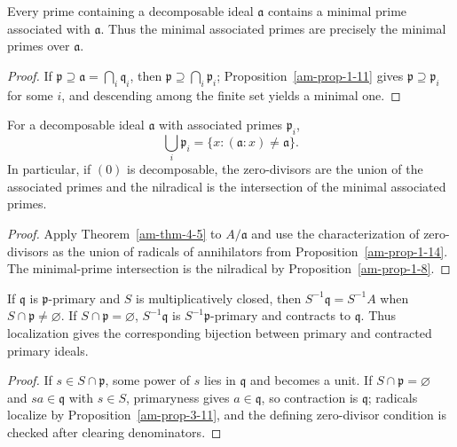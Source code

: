 \begin{proposition}
\label{am-prop-4-6}
\uses{}
Every prime containing a decomposable ideal $\mathfrak{a}$ contains a minimal prime
associated with $\mathfrak{a}$.  Thus the minimal associated primes are precisely
the minimal primes over $\mathfrak{a}$.
\end{proposition}
\begin{proof}
If $\mathfrak{p}\supseteq\mathfrak{a}=\bigcap_i\mathfrak{q}_i$, then
$\mathfrak{p}\supseteq\bigcap_i\mathfrak{p}_i$; Proposition~\ref{am-prop-1-11} gives
$\mathfrak{p}\supseteq\mathfrak{p}_i$ for some $i$, and descending among the finite set yields a
minimal one.
\end{proof}
\begin{proposition}
\label{am-prop-4-7}
\uses{}
For a decomposable ideal $\mathfrak{a}$ with associated primes $\mathfrak{p}_i$,
\[
\bigcup_i\mathfrak{p}_i=\{x:(\mathfrak{a}:x)\ne\mathfrak{a}\}.
\]
In particular, if $(0)$ is decomposable, the zero-divisors are the union of
the associated primes and the nilradical is the intersection of the minimal
associated primes.
\end{proposition}
\begin{proof}
Apply Theorem~\ref{am-thm-4-5} to $A/\mathfrak{a}$ and use the characterization of
zero-divisors as the union of radicals of annihilators from
Proposition~\ref{am-prop-1-14}.  The minimal-prime intersection is the
nilradical by Proposition~\ref{am-prop-1-8}.
\end{proof}
\begin{proposition}
\label{am-prop-4-8}
\uses{}
If $\mathfrak{q}$ is $\mathfrak{p}$-primary and $S$ is multiplicatively closed, then
$S^{-1}\mathfrak{q}=S^{-1}A$ when $S\cap\mathfrak{p}\ne\varnothing$.  If $S\cap\mathfrak{p}=\varnothing$,
$S^{-1}\mathfrak{q}$ is $S^{-1}\mathfrak{p}$-primary and contracts to $\mathfrak{q}$.  Thus localization
gives the corresponding bijection between primary and contracted primary
ideals.
\end{proposition}
\begin{proof}
If $s\in S\cap\mathfrak{p}$, some power of $s$ lies in $\mathfrak{q}$ and becomes a unit.  If
$S\cap\mathfrak{p}=\varnothing$ and $sa\in\mathfrak{q}$ with $s\in S$, primaryness gives
$a\in\mathfrak{q}$, so contraction is $\mathfrak{q}$; radicals localize by Proposition~\ref{am-prop-3-11},
and the defining zero-divisor condition is checked after clearing denominators.
\end{proof}
